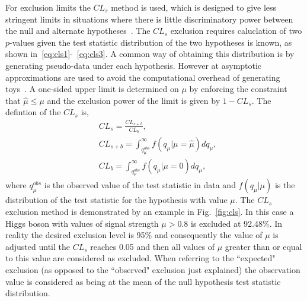 For exclusion limits the $CL_{s}$ method is used, which is designed to give less stringent limits in situations where there is little discriminatory power between the null and alternate hypotheses~\cite{cls}. The $CL_{s}$ exclusion requires caluclation of two $p$-values given the test statistic distribution of the two hypotheses is known, as shown in~\ref{eq:cls1}-~\ref{eq:cls3}. A common way of obtaining this distribution is by generating pseudo-data under each hypothesis. However at \CMS asymptotic approximations are used to avoid the computational overhead of generating toys~\cite{asymptotic_form}. A one-sided upper limit is determined on $\mu$ by enforcing the constraint that $\hat{\mu}\leq\mu$ and the exclusion power of the limit is given by $1-CL_{s}$. The defintion of the $CL_{s}$ is, 
\begin{align}
  & CL_{s} = \frac{CL_{s+b}}{CL_{b}} \label{eq:cls1}, \\
  & CL_{s+b} = \int_{q_{\mu}^{obs}}^{\infty}f(q_{\mu}|\mu=\hat{\mu})dq_{\mu} \label{eq:cls2}, \\
  & CL_{b} = \int_{q_{\mu}^{obs}}^{\infty}f(q_{\mu}|\mu=0)dq_{\mu} \label{eq:cls3}, 
\end{align}
where $q_{\mu}^{obs}$ is the observed value of the test statistic in data and $f(q_{\mu}|\mu)$ is the distribution of the test statistic for the hypothesis with value $\mu$. The $CL_{s}$ exclusion method is demonstrated by an example in Fig.~\ref{fig:cls}. In this case a \SM Higgs boson with values of signal strength $\mu>0.8$ is excluded at 92.48\%. In reality the desired exclusion level is 95\% and consequently the value of $\mu$ is adjusted until the $CL_{s}$ reaches 0.05 and then all values of $\mu$ greater than or equal to this value are considered as excluded. When referring to the ``expected" exclusion (as opposed to the ``observed" exclusion just explained) the observation value is considered as being at the mean of the null hypothesis test statistic distribution.

